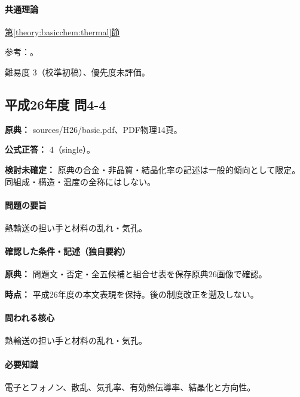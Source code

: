 \paragraph{共通理論} \hyperref[theory:basicchem:thermal]{第\ref*{theory:basicchem:thermal}節}

\par 参考：\cite{aist_metal_thermal,openstax_thermal_conduction,chem55_polymer}。

\par 難易度 3（校準初稿）、優先度未評価。

\subsection{平成26年度 問4-4}
\label{q:h26-reg-basic-4-4}

\noindent\textbf{原典：} sources/H26/basic.pdf、PDF物理14頁。

\textbf{公式正答：} 4（single）。

\par\textbf{検討未確定：} 原典の合金・非晶質・結晶化率の記述は一般的傾向として限定。同組成・構造・温度の全称にはしない。

\paragraph{問題の要旨} 熱輸送の担い手と材料の乱れ・気孔。

\paragraph{確認した条件・記述（独自要約）}\mbox{}\par

\noindent\textbf{原典：} 問題文・否定・全五候補と組合せ表を保存原典26画像で確認。\par

\noindent\textbf{時点：} 平成26年度の本文表現を保持。後の制度改正を遡及しない。\par

\paragraph{問われる核心} 熱輸送の担い手と材料の乱れ・気孔。

\paragraph{必要知識} 電子とフォノン、散乱、気孔率、有効熱伝導率、結晶化と方向性。


